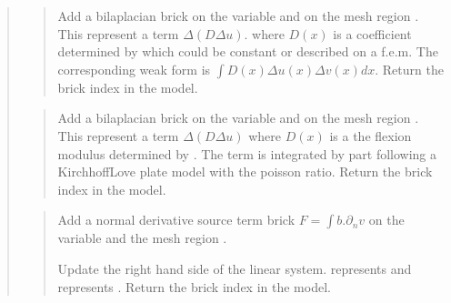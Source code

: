 \documentclass[a4paper,11pt,english]{sphinxmanual}
\begin{document}
\begin{quote}
\begin{quote}

Add a bilaplacian brick on the variable
 and on the mesh region .
This represent a term \(\Delta(D \Delta u)\).
where \(D(x)\) is a coefficient determined by  which
could be constant or described on a f.e.m. The corresponding weak form
is \(\int D(x)\Delta u(x) \Delta v(x) dx\).
Return the brick index in the model.
\end{quote}

\begin{quote}

Add a bilaplacian brick on the variable
 and on the mesh region .
This represent a term \(\Delta(D \Delta u)\) where \(D(x)\)
is a the flexion modulus determined by . The term is
integrated by part following a Kirchhoff\sphinxhyphen{}Love plate model
with  the poisson ratio.
Return the brick index in the model.
\end{quote}

\begin{quote}

Add a normal derivative source term brick
\(F = \int b.\partial_n v\) on the variable  and the
mesh region .

Update the right hand side of the linear system.
 represents  and  represents .
Return the brick index in the model.
\end{quote}

\begin{quote}


\end{quote}
\end{quote}
\end{document}
